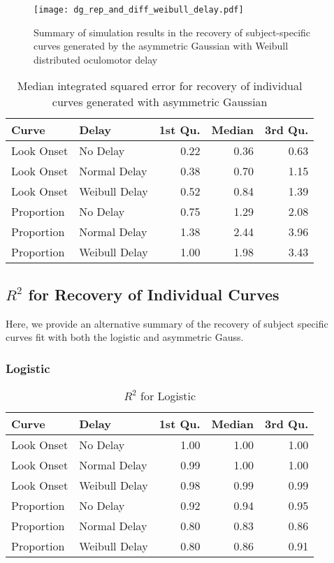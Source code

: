 \begin{figure}[H]
\centering
\texttt{[image: dg\_rep\_and\_diff\_weibull\_delay.pdf]}
\caption{Summary of simulation results in the recovery of subject-specific curves generated by the asymmetric Gaussian with Weibull distributed oculomotor delay}
\label{fig:dg_rep_curves_weibull_delay}
\end{figure}




\begin{table}[H]
\centering
\begin{tabular}{llrrr}
  \hline
Curve & Delay & 1st Qu. & Median & 3rd Qu. \\ 
  \hline
Look Onset & No Delay & 0.22 & 0.36 & 0.63 \\ 
  Look Onset & Normal Delay & 0.38 & 0.70 & 1.15 \\ 
  Look Onset & Weibull Delay & 0.52 & 0.84 & 1.39 \\ 
  Proportion & No Delay & 0.75 & 1.29 & 2.08 \\ 
  Proportion & Normal Delay & 1.38 & 2.44 & 3.96 \\ 
  Proportion & Weibull Delay & 1.00 & 1.98 & 3.43 \\ 
   \hline
\end{tabular}
\caption{Median integrated squared error for recovery of individual curves generated with asymmetric Gaussian}
\label{tab:dg_mise_sims}
\end{table}

\subsection{$R^2$ for Recovery of Individual Curves}

Here, we provide an alternative summary of the recovery of subject specific curves fit with both the logistic and asymmetric Gauss. 


\subsubsection{Logistic}

\begin{table}[H]
\centering
\begin{tabular}{llrrr}
  \hline
Curve & Delay & 1st Qu. & Median & 3rd Qu. \\ 
  \hline
Look Onset & No Delay & 1.00 & 1.00 & 1.00 \\ 
  Look Onset & Normal Delay & 0.99 & 1.00 & 1.00 \\ 
  Look Onset & Weibull Delay & 0.98 & 0.99 & 0.99 \\ 
  Proportion & No Delay & 0.92 & 0.94 & 0.95 \\ 
  Proportion & Normal Delay & 0.80 & 0.83 & 0.86 \\ 
  Proportion & Weibull Delay & 0.80 & 0.86 & 0.91 \\ 
   \hline
\end{tabular}
\caption{$R^2$ for Logistic}
\label{tab:r2_logistic_sims}
\end{table}

